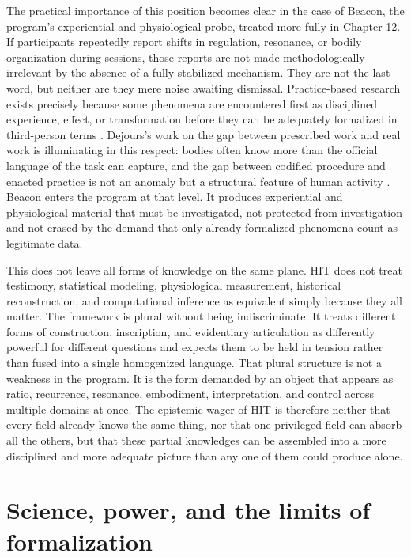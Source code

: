 The practical importance of this position becomes clear in the case of Beacon, the program's experiential and physiological probe, treated more fully in Chapter 12. If participants repeatedly report shifts in regulation, resonance, or bodily organization during sessions, those reports are not made methodologically irrelevant by the absence of a fully stabilized mechanism. They are not the last word, but neither are they mere noise awaiting dismissal. Practice-based research exists precisely because some phenomena are encountered first as disciplined experience, effect, or transformation before they can be adequately formalized in third-person terms \parencite{borgdorff_2012, kindon_2007}. Dejours's work on the gap between prescribed work and real work is illuminating in this respect: bodies often know more than the official language of the task can capture, and the gap between codified procedure and enacted practice is not an anomaly but a structural feature of human activity \parencite{dejours_1980}. Beacon enters the program at that level. It produces experiential and physiological material that must be investigated, not protected from investigation and not erased by the demand that only already-formalized phenomena count as legitimate data.

This does not leave all forms of knowledge on the same plane. HIT does not treat testimony, statistical modeling, physiological measurement, historical reconstruction, and computational inference as equivalent simply because they all matter. The framework is plural without being indiscriminate. It treats different forms of construction, inscription, and evidentiary articulation as differently powerful for different questions and expects them to be held in tension rather than fused into a single homogenized language. That plural structure is not a weakness in the program. It is the form demanded by an object that appears as ratio, recurrence, resonance, embodiment, interpretation, and control across multiple domains at once. The epistemic wager of HIT is therefore neither that every field already knows the same thing, nor that one privileged field can absorb all the others, but that these partial knowledges can be assembled into a more disciplined and more adequate picture than any one of them could produce alone.

\section{Science, power, and the limits of formalization}

